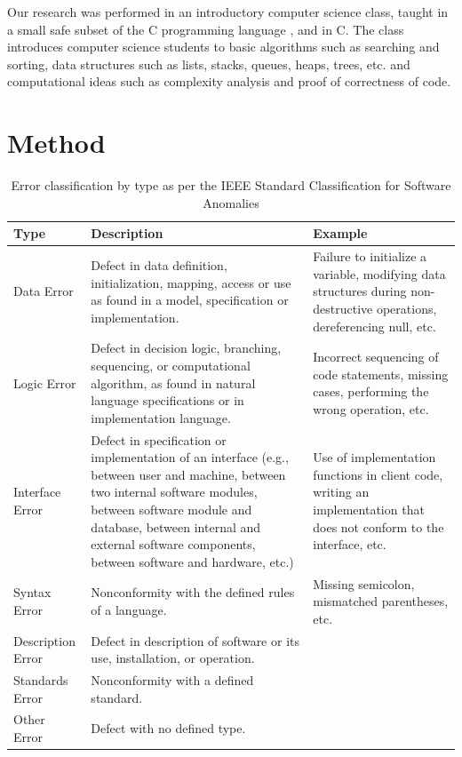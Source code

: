 \documentclass{sig-alternate}
\begin{document}
Our research was performed in an introductory computer science class, taught in a small safe subset of the C programming language \cite{Arnold10, PfenningCortinaLovas11}, and in C. The class introduces computer science students to basic algorithms such as searching and sorting, data structures such as lists, stacks, queues, heaps, trees, etc. and computational ideas such as complexity analysis and proof of correctness of code.


\section{Method}
\label{sec:method}

\begin{table}
\def\arraystretch{1.75}
\centering
\caption{Error classification by type as per the IEEE Standard Classification for Software Anomalies \cite{IEEE10}}
\label{table:IEEE}
\begin{tabular}{|p{1in}|p{3in}|p{2.4in}|} \hline
\textbf{Type} & \textbf{Description} & \textbf{Example}\\ \hline
Data Error&
Defect in data definition, initialization, mapping, access or use as found in a model, specification or implementation.&
Failure to initialize a variable, modifying data structures during non-destructive operations, dereferencing null, etc.\\ \hline

Logic Error&
Defect in decision logic, branching, sequencing, or computational algorithm, as found in natural language specifications or in
implementation language.&
Incorrect sequencing of code statements, missing cases, performing the wrong operation, etc.\\ \hline

Interface Error&
Defect in specification or implementation of an interface (e.g., between user and machine, between two internal software modules, between software module and database, between internal and external software components, between software and hardware, etc.)&
Use of implementation functions in client code, writing an implementation that does not conform to the interface, etc.\\ \hline

Syntax Error&
Nonconformity with the defined rules of a language.&
Missing semicolon, mismatched parentheses, etc.\\ \hline

Description Error&
Defect in description of software or its use, installation, or operation.&
\\ \hline

Standards Error&
Nonconformity with a defined standard.&
\\ \hline

Other Error&
Defect with no defined type.
&
\\ \hline
\end{tabular}
\end{table}
\end{document}
